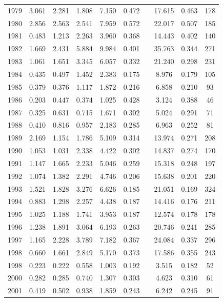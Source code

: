 \documentclass[]{article}
\begin{document}
\begin{table}[ht]
\begin{tabular}{lccccccccc}
  1979 & 3.061 & 2.281 & 1.808 & 7.150 & 0.472 & & 17.615 & 0.463 & 178 \\
  1980 & 2.856 & 2.563 & 2.541 & 7.959 & 0.572 & & 22.017 & 0.507 & 185 \\
  1981 & 0.483 & 1.213 & 2.263 & 3.960 & 0.368 & & 14.443 & 0.402 & 140 \\
  1982 & 1.669 & 2.431 & 5.884 & 9.984 & 0.401 & & 35.763 & 0.344 & 271 \\
  1983 & 1.061 & 1.651 & 3.345 & 6.057 & 0.332 & & 21.240 & 0.298 & 231 \\
  1984 & 0.435 & 0.497 & 1.452 & 2.383 & 0.175 & & 8.976 & 0.179 & 105 \\
  1985 & 0.379 & 0.376 & 1.117 & 1.872 & 0.216 & & 6.858 & 0.210 & 93 \\
  1986 & 0.203 & 0.447 & 0.374 & 1.025 & 0.428 & & 3.124 & 0.388 & 46 \\
  1987 & 0.325 & 0.631 & 0.715 & 1.671 & 0.302 & & 5.024 & 0.291 & 71 \\
  1988 & 0.410 & 0.816 & 0.957 & 2.183 & 0.285 & & 6.963 & 0.252 & 81 \\
  1989 & 2.169 & 1.154 & 1.786 & 5.109 & 0.314 & & 13.974 & 0.271 & 208 \\
  1990 & 1.053 & 1.031 & 2.338 & 4.422 & 0.302 & & 14.837 & 0.274 & 170 \\
  1991 & 1.147 & 1.665 & 2.233 & 5.046 & 0.259 & & 15.318 & 0.248 & 197 \\
  1992 & 1.074 & 1.382 & 2.291 & 4.746 & 0.206 & & 15.638 & 0.201 & 220 \\
  1993 & 1.521 & 1.828 & 3.276 & 6.626 & 0.185 & & 21.051 & 0.169 & 324 \\
  1994 & 0.883 & 1.298 & 2.257 & 4.438 & 0.187 & & 14.416 & 0.176 & 211 \\
  1995 & 1.025 & 1.188 & 1.741 & 3.953 & 0.187 & & 12.574 & 0.178 & 178 \\
  1996 & 1.238 & 1.891 & 3.064 & 6.193 & 0.263 & & 20.746 & 0.241 & 285 \\
  1997 & 1.165 & 2.228 & 3.789 & 7.182 & 0.367 & & 24.084 & 0.337 & 296 \\
  1998 & 0.660 & 1.661 & 2.849 & 5.170 & 0.373 & & 17.586 & 0.355 & 243 \\
  1998 & 0.223 & 0.222 & 0.558 & 1.003 & 0.192 & & 3.515 & 0.182 & 52 \\
  2000 & 0.282 & 0.285 & 0.740 & 1.307 & 0.303 & & 4.623 & 0.310 & 61 \\
  2001 & 0.419 & 0.502 & 0.938 & 1.859 & 0.243 & & 6.242 & 0.245 & 91 \\

\end{tabular}
\end{table}
\end{document}
